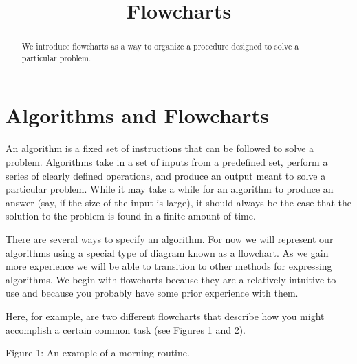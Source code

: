 \documentclass{ximera}
\title{Flowcharts}
\begin{document}
\begin{abstract}
We introduce flowcharts as a way to organize a procedure designed to solve a particular problem.
\end{abstract}
\maketitle

\section{Algorithms and Flowcharts}
An algorithm is a fixed set of instructions that can be followed to solve a problem. Algorithms take in a set of inputs from a predefined set, perform a series of clearly defined operations, and produce an output meant to solve a particular problem. While it may take a while for an algorithm to produce an answer (say, if the size of the input is large), it should always be the case that the solution to the problem is found in a finite amount of time.

There are several ways to specify an algorithm. For now we will represent our algorithms using a special type of diagram known as a flowchart. As we gain more experience we will be able to transition to other methods for expressing algorithms. We begin with flowcharts because they are a relatively intuitive to use and because you probably have some prior experience with them.

Here, for example, are two different flowcharts that describe how you might accomplish a certain common task (see Figures 1 and 2).

\begin{center}
\end{center}
\begin{center}
	Figure 1: An example of a morning routine.
\end{center}
\end{document}
